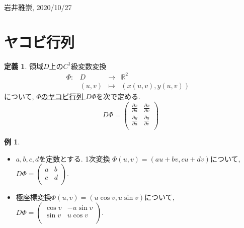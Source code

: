 \documentclass[dvipdfmx,a4paper,11pt]{article}
\newcommand{\R}{\mathbb{R}}
\theoremstyle{definition}
\newtheorem{dfn}[thm]{定義}
\newtheorem{exa}[thm]{例}
\newcommand{\pdrv}[2]{\frac{\partial #1}{\partial #2}}
\begin{document}
\begin{flushright}
 岩井雅崇, 2020/10/27
\end{flushright}


\section{ヤコビ行列}
\begin{tcolorbox}[
    colback = white,
    colframe = green!35!black,
    fonttitle = \bfseries,
    breakable = true]
    \begin{dfn}
 領域$D$上の$C^1$級変数変換
 $$
\begin{array}{ccccc}
\Phi: &D & \rightarrow & \R^2 & \\
&(u,v) & \longmapsto & (x(u,v),y(u,v))&
\end{array}
$$
について, \underline{$\Phi$のヤコビ行列 }$D\Phi$を次で定める.
$$
D\Phi
=
\left(\begin{array}{cc} \pdrv{x}{u} & \pdrv{x}{v} \\ \pdrv{y}{u}& \pdrv{y}{v} \\ \end{array} \right)
$$

    \end{dfn}
    \end{tcolorbox}

\begin{exa}
\text{}
\begin{itemize}
\item $a,b,c,d$を定数とする.
1次変換
$\Phi(u,v)  = (au+bv, cu+dv)$について, 
$D\Phi = \left(\begin{array}{cc} a& b\\ c& d\\ \end{array} \right).$
\item 極座標変換$\Phi(u,v)  = (u \cos v, u \sin v)$について, 
$D\Phi = \left(\begin{array}{cc} \cos v& -u\sin v\\ \sin v& u \cos v\\ \end{array} \right).$
\end{itemize}

\end{exa}
\end{document}
